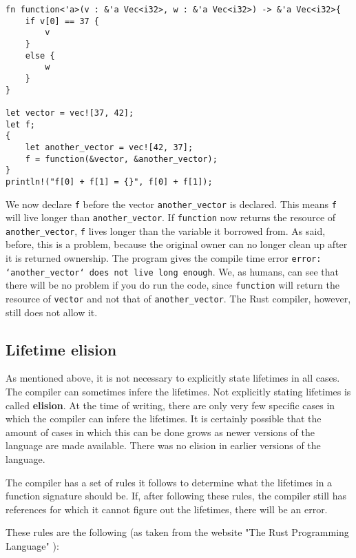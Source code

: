 \begin{verbatim}
fn function<'a>(v : &'a Vec<i32>, w : &'a Vec<i32>) -> &'a Vec<i32>{
    if v[0] == 37 {
        v
    }
    else {
        w
    }
}

let vector = vec![37, 42];
let f;
{
    let another_vector = vec![42, 37];
    f = function(&vector, &another_vector);
}
println!("f[0] + f[1] = {}", f[0] + f[1]);
\end{verbatim}

We now declare \verb|f| before the vector \verb|another_vector| is declared. This means \verb|f| will live longer than \verb|another_vector|. If \verb|function| now returns the resource of \verb|another_vector|, \verb|f| lives longer than the variable it borrowed from. As said, before, this is a problem, because the original owner can no longer clean up after it is returned ownership. The program gives the compile time error \texttt{error: `another\_vector` does not live long enough}. We, as humans, can see that there will be no problem if you do run the code, since \verb|function| will return the resource of \verb|vector| and not that of \verb|another_vector|. The Rust compiler, however, still does not allow it. 

\subsection{Lifetime elision}
As mentioned above, it is not necessary to explicitly state lifetimes in all cases. The compiler can sometimes infere the lifetimes. Not explicitly stating lifetimes is called \textbf{elision}. At the time of writing, there are only very few specific cases in which the compiler can infere the lifetimes. It is certainly possible that the amount of cases in which this can be done grows as newer versions of the language are made available. There was no elision in earlier versions of the language. 

The compiler has a set of rules it follows to determine what the lifetimes in a function signature should be. If, after following these rules, the compiler still has references for which it cannot figure out the lifetimes, there will be an error. 

These rules are the following (as taken from the website "The Rust Programming Language" \citep{lifetimes}):

